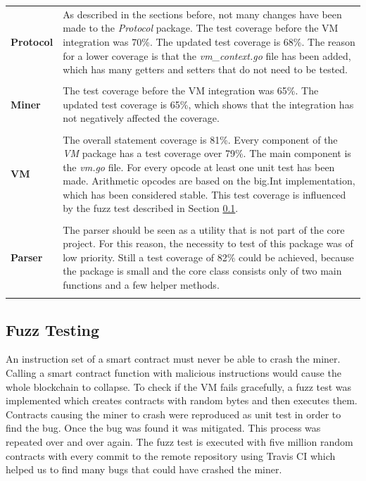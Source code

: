 \begin{tabular}[t]{ p{3cm} p{12.5cm}}
\raggedright
\textbf{Protocol} &
As described in the sections before, not many changes have been made to the \textit{Protocol} package. The test coverage before the VM integration was 70\%. The updated test coverage is 68\%. The reason for a lower coverage is that the \textit{vm\_context.go} file has been added, which has many getters and setters that do not need to be tested. \\ \\
\textbf{Miner} &
The test coverage before the VM integration was 65\%. The updated test coverage is 65\%, which shows that the integration has not negatively affected the coverage. \\ \\
\textbf{VM} &
The overall statement coverage is 81\%. Every component of the \textit{VM} package has a test coverage over 79\%. The main component is the \textit{vm.go} file. For every opcode at least one unit test has been made. Arithmetic opcodes are based on the big.Int implementation, which has been considered stable. This test coverage is influenced by the fuzz test described in Section \ref{fuzz_testing}. \\ \\
\textbf{Parser} &
The parser should be seen as a utility that is not part of the core project. For this reason, the necessity to test of this package was of low priority. Still a test coverage of 82\% could be achieved, because the package is small and the core class consists only of two main functions and a few helper methods. \\ \\
\end{tabular}

\subsection{Fuzz Testing} \label{fuzz_testing}
An instruction set of a smart contract must never be able to crash the miner. Calling a smart contract function with malicious instructions would cause the whole blockchain to collapse. To check if the VM fails gracefully, a fuzz test was implemented which creates contracts with random bytes and then executes them. Contracts causing the miner to crash were reproduced as unit test in order to find the bug. Once the bug was found it was mitigated. This process was repeated over and over again. The fuzz test is executed with five million random contracts with every commit to the remote repository using Travis CI which helped us to find many bugs that could have crashed the miner.

